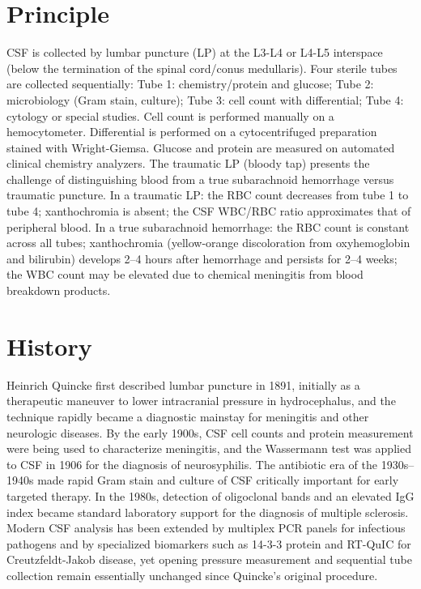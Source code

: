 \section*{Principle}
CSF is collected by lumbar puncture (LP) at the L3-L4 or L4-L5 interspace (below the termination of the spinal cord/conus medullaris). Four sterile tubes are collected sequentially: Tube 1: chemistry/protein and glucose; Tube 2: microbiology (Gram stain, culture); Tube 3: cell count with differential; Tube 4: cytology or special studies. Cell count is performed manually on a hemocytometer. Differential is performed on a cytocentrifuged preparation stained with Wright-Giemsa. Glucose and protein are measured on automated clinical chemistry analyzers. The traumatic LP (bloody tap) presents the challenge of distinguishing blood from a true subarachnoid hemorrhage versus traumatic puncture. In a traumatic LP: the RBC count decreases from tube 1 to tube 4; xanthochromia is absent; the CSF WBC/RBC ratio approximates that of peripheral blood. In a true subarachnoid hemorrhage: the RBC count is constant across all tubes; xanthochromia (yellow-orange discoloration from oxyhemoglobin and bilirubin) develops 2--4 hours after hemorrhage and persists for 2--4 weeks; the WBC count may be elevated due to chemical meningitis from blood breakdown products.
\section*{History}
Heinrich Quincke first described lumbar puncture in 1891, initially as a therapeutic maneuver to lower intracranial pressure in hydrocephalus, and the technique rapidly became a diagnostic mainstay for meningitis and other neurologic diseases. By the early 1900s, CSF cell counts and protein measurement were being used to characterize meningitis, and the Wassermann test was applied to CSF in 1906 for the diagnosis of neurosyphilis. The antibiotic era of the 1930s--1940s made rapid Gram stain and culture of CSF critically important for early targeted therapy. In the 1980s, detection of oligoclonal bands and an elevated IgG index became standard laboratory support for the diagnosis of multiple sclerosis. Modern CSF analysis has been extended by multiplex PCR panels for infectious pathogens and by specialized biomarkers such as 14-3-3 protein and RT-QuIC for Creutzfeldt-Jakob disease, yet opening pressure measurement and sequential tube collection remain essentially unchanged since Quincke's original procedure.
